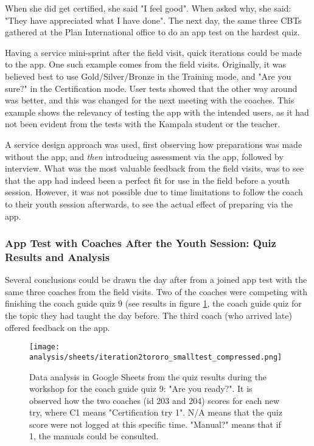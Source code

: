   When she did get certified, she said "I feel good". When asked why, she said: "They have appreciated what I have done". The next day, the same three CBTs gathered at the Plan International office to do an app test on the hardest quiz.

  Having a service mini-sprint after the field visit, quick iterations could be made to the app. One such example comes from the field visits. Originally, it was believed best to use Gold/Silver/Bronze in the Training mode, and "Are you sure?" in the Certification mode. User tests showed that the other way around was better, and this was changed for the next meeting with the coaches. This example shows the relevancy of testing the app with the intended users, as it had not been evident from the tests with the Kampala student or the teacher.

  A service design approach was used, first observing how preparations was made without the app, and \textit{then} introducing assessment via the app, followed by interview. What was the most valuable feedback from the field visits, was to see that the app had indeed been a perfect fit for use in the field before a youth session. However, it was not possible due to time limitations to follow the coach to their youth session afterwards, to see the actual effect of preparing via the app.

  \subsubsection{App Test with Coaches After the Youth Session: Quiz Results and Analysis}

  Several conclusions could be drawn the day after from a joined app test with the same three coaches from the field visits. Two of the coaches were competing with finishing the coach guide quiz 9 (see results in figure \ref{fig:areYouReady}, the coach guide quiz for the topic they had taught the day before. The third coach (who arrived late) offered feedback on the app.

  \begin{figure}[h]
    \centering
    \texttt{[image: analysis/sheets/iteration2tororo\_smalltest\_compressed.png]}
    \caption{Data analysis in Google Sheets from the quiz results during the workshop for the coach guide quiz 9: "Are you ready?". It is observed how the two coaches (id 203 and 204) scores for each new try, where C1 means "Certification try 1". N/A means that the quiz score were not logged at this specific time. "Manual?" means that if 1, the manuals could be consulted.}
    \label{fig:areYouReady}
  \end{figure}

